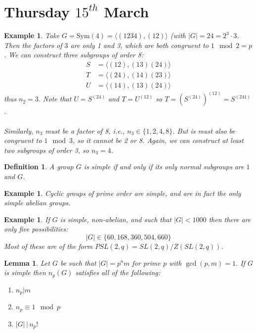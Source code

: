 \documentclass[a4paper,10pt]{article}
\newtheorem{Def}[thm]{Definition}
\newtheorem{eg}[thm]{Example}
\newtheorem{Lem}[thm]{Lemma}
\begin{document}
\newpage
\section{Thursday $15^{th}$ March}

\begin{eg}
Take $G = \text{Sym}(4) = \langle (1234), (12) \rangle$ (with $|G| = 24 = 2^3 \cdot 3$. Then the factors of $3$ are only 1 and 3, which are both congruent to $1\mod 2 = p$. We can construct three subgroups of order 8:
\begin{align*}
S &= \langle (12), (13)(24) \rangle \\
T &= \langle (24), (14)(23) \rangle \\
U &= \langle (14), (13)(24) \rangle
\end{align*}
thus $n_2 = 3$. Note that $U = S^{(24)}$ and $T = U^{(12)}$ so $T = (S^{(24)})^{(12)}= S^{(241)}$. \\
\\
Similarly, $n_3$ must be a factor of 8, i.e., $n_3 \in \{1,2,4,8\}$. But is must also be congruent to $1 \mod 3$, so it cannot be 2 or 8. Again, we can construct at least two subgroups of order 3, so $n_3 = 4$. 

\end{eg}

\begin{Def}
A group $G$ is simple if and only if its only normal subgroups are $1$ and $G$. 
\end{Def}

\begin{eg}
Cyclic groups of prime order are simple, and are in fact the only simple abelian groups. 
\end{eg}

\begin{eg}
If $G$ is simple, non-abelian, and such that $|G| < 1000$ then there are only five possibilities:
\[ |G| \in \{ 60, 168, 360, 504, 660 \} \]
Most of these are of the form $PSL(2,q) = SL(2,q) / Z(SL(2,q))$.
\end{eg}

\begin{Lem}
Let $G$ be such that $|G| = p^a m$ for prime $p$ with $\gcd(p,m) = 1$. If $G$ is simple then $n_p(G)$ satisfies all of the following:
\begin{enumerate}
\item $n_p | m$
\item $n_p \equiv 1 \mod p$
\item $|G| \, \big| \, n_p!$
\end{enumerate}
\end{Lem}
\end{document}

